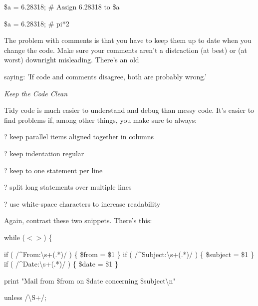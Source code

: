 \documentclass[a4paper,11pt]{book}
\begin{document}
\noindent \$a = 6.28318; \# Assign 6.28318 to \$a

\noindent 

\noindent 

\noindent \$a = 6.28318; \# pi*2

\noindent 

\noindent The problem with comments is that you have to keep them up to date when you change the code. Make sure your comments aren't a distraction (at best) or (at worst) downright misleading. There's an old

\noindent saying: 'If code and comments disagree, both are probably wrong.'

\noindent 

\noindent \textit{Keep the Code Clean}

\noindent Tidy code is much easier to understand and debug than messy code. It's easier to find problems if, among other things, you make sure to always:

\noindent 

\noindent ? keep parallel items aligned together in columns

\noindent 

\noindent ? keep indentation regular

\noindent 

\noindent ? keep to one statement per line

\noindent 

\noindent ? split long statements over multiple lines

\noindent 

\noindent ? use white-space characters to increase readability

\noindent 

\noindent Again, contrast these two snippets. There's this:

\noindent 

\noindent 

\noindent while ($<$$>$) \{

\noindent if ( /\^{}From:\textbackslash s+(.*)/ ) \{ \$from = \$1 \} if ( /\^{}Subject:\textbackslash s+(.*)/ ) \{ \$subject = \$1 \} if ( /\^{}Date:\textbackslash s+(.*)/ ) \{ \$date = \$1 \}

\noindent 

\noindent 

\noindent print "Mail from \$from on \$date concerning \$subject\textbackslash n"

\noindent unless /\textbackslash S+/;
\end{document}
